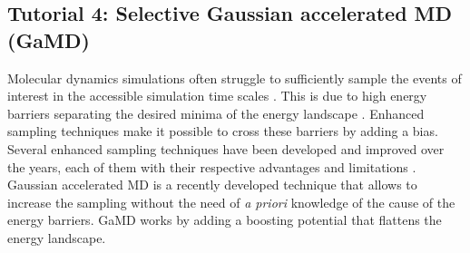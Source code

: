 
\subsection{Tutorial 4: Selective Gaussian accelerated MD (GaMD)}
Molecular dynamics simulations often struggle to sufficiently sample the events of interest in the accessible simulation time scales \cite{hansson2002molecular}.
This is due to high energy barriers separating the desired minima of the energy landscape \cite{volkhardt2022estimating}.
Enhanced sampling techniques make it possible to cross these barriers by adding a bias. Several enhanced sampling techniques have been developed and improved over the years, each of them with their respective advantages and limitations \cite{yang2019enhanced}.
Gaussian accelerated MD is a recently developed technique that allows to increase the sampling without the need of \textit{a priori} knowledge of the cause of the energy barriers. GaMD works by adding a boosting potential that flattens the energy landscape.

